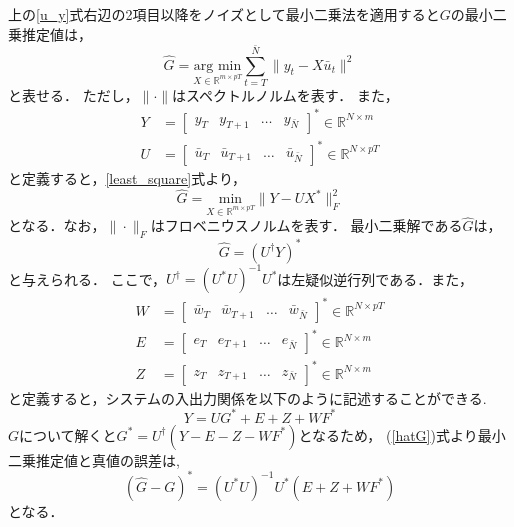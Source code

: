 上の\eqref{u_y}式右辺の2項目以降をノイズとして最小二乗法を適用すると$G$の最小二乗推定値は，
\begin{equation}
\label{least_square}
    \hat{G} = \underset{X \in \mathbb{R}^{m \times pT}}{\text{arg min}} \sum_{t = T}^{\bar{N}} \| y_t - X\bar{u}_t \|^2 
\end{equation}
と表せる．
ただし，$\| \cdot \|$はスペクトルノルムを表す．
また，
\begin{align}
    Y &=
    \begin{bmatrix}
        y_T & y_{T+1} & \ldots & y_{\bar{N}}
    \end{bmatrix}^*\in \mathbb{R}^{N \times m}  \\
    \label{U}
    U &=
    \begin{bmatrix}
        \bar{u}_T & \bar{u}_{T+1} & \ldots & \bar{u}_{\bar{N}}
    \end{bmatrix}^*\in \mathbb{R}^{N \times pT}
\end{align}
と定義すると，\eqref{least_square}式より，
\begin{equation}
    \hat{G} = \underset{X \in \mathbb{R}^{m \times pT}}{\text{min}}  \| Y - UX^* \|_F^2
\end{equation}
となる．なお，$\|\cdot\|_F$はフロベニウスノルムを表す．
最小二乗解である$\hat{G}$は，
\begin{equation}
    \label{hatG}
    \hat{G} = (U^{\dag}Y)^*
\end{equation}
と与えられる．
ここで，$U^{\dag} = (U^*U)^{-1}U^*$は左疑似逆行列である．また，
\begin{align}
    \label{W_norm}
    W &=
    \begin{bmatrix}
        \bar{w}_T & \bar{w}_{T+1} & \ldots & \bar{w}_{\bar{N}}
    \end{bmatrix}^*\in \mathbb{R}^{N \times pT}\\
    \label{E}
    E &=
    \begin{bmatrix}
        e_T & e_{T+1} & \ldots & e_{\bar{N}}
    \end{bmatrix}^*\in \mathbb{R}^{N \times m}\\
    Z &=
    \begin{bmatrix}
        z_T & z_{T+1} & \ldots & z_{\bar{N}}
    \end{bmatrix}^*\in \mathbb{R}^{N \times m}
\end{align}
と定義すると，システムの入出力関係を以下のように記述することができる.
\begin{equation}
    Y = UG^*+E + Z + WF^*
\end{equation}
$G$について解くと$G^* = U^{\dag}(Y - E - Z - WF^*) $となるため，
(\ref{hatG})式より最小二乗推定値と真値の誤差は,
\begin{equation}
    \label{error}
    (\hat{G} - G)^* = (U^*U)^{-1}U^*(E + Z +WF^*) 
\end{equation}
となる．

